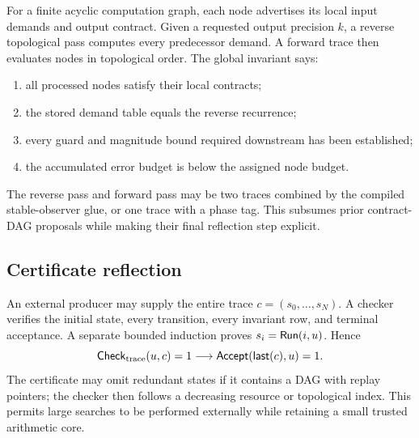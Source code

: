 For a finite acyclic computation graph, each node advertises its local input demands and output contract.  Given a requested output precision \(k\), a reverse topological pass computes every predecessor demand.  A forward trace then evaluates nodes in topological order.  The global invariant says:
\begin{enumerate}
\item all processed nodes satisfy their local contracts;
\item the stored demand table equals the reverse recurrence;
\item every guard and magnitude bound required downstream has been established;
\item the accumulated error budget is below the assigned node budget.
\end{enumerate}
The reverse pass and forward pass may be two traces combined by the compiled stable-observer glue, or one trace with a phase tag.  This subsumes prior contract-DAG proposals while making their final reflection step explicit.

\subsection{Certificate reflection}

An external producer may supply the entire trace \(c=(s_0,\dots,s_N)\).  A checker verifies the initial state, every transition, every invariant row, and terminal acceptance.  A separate bounded induction proves \(s_i=\mathsf{Run}(i,u)\).  Hence
\[
  \mathsf{Check}_{\mathrm{trace}}(u,c)=1\longrightarrow
  \mathsf{Accept}(\mathsf{last}(c),u)=1.
\]
The certificate may omit redundant states if it contains a DAG with replay pointers; the checker then follows a decreasing resource or topological index.  This permits large searches to be performed externally while retaining a small trusted arithmetic core.
